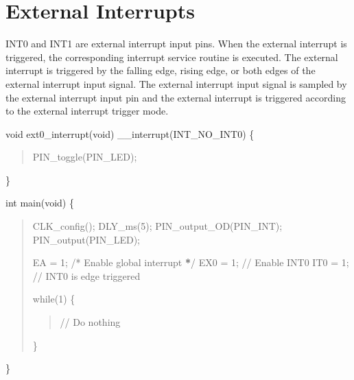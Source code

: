 \documentclass[letterpaper,10pt,english]{sphinxmanual}
\begin{document}
\section{External Interrupts}
\label{\detokenize{interrupts:external-interrupts}}
\sphinxAtStartPar
INT0 and INT1 are external interrupt input pins. When the external interrupt is triggered, the
corresponding interrupt service routine is executed. The external interrupt is triggered by the
falling edge, rising edge, or both edges of the external interrupt input signal. The external interrupt
input signal is sampled by the external interrupt input pin and the external interrupt is triggered
according to the external interrupt trigger mode.
\begin{description}
\sphinxAtStartPar
void ext0\_interrupt(void) \_\_interrupt(INT\_NO\_INT0)
\{
\begin{quote}

\sphinxAtStartPar
PIN\_toggle(PIN\_LED);
\end{quote}

\sphinxAtStartPar
\}

\sphinxAtStartPar
int main(void)
\{
\begin{quote}

\sphinxAtStartPar
CLK\_config();
DLY\_ms(5);
PIN\_output\_OD(PIN\_INT);
PIN\_output(PIN\_LED);

\sphinxAtStartPar
EA  = 1;     /* Enable global interrupt {\color{red}\bfseries{}*}/
EX0 = 1;    // Enable INT0
IT0 = 1;    // INT0 is edge triggered

\sphinxAtStartPar
while(1)
\{
\begin{quote}

\sphinxAtStartPar
// Do nothing
\end{quote}

\sphinxAtStartPar
\}
\end{quote}

\sphinxAtStartPar
\}

\end{description}



\renewcommand{\indexname}{Index}
\printindex
\end{document}
